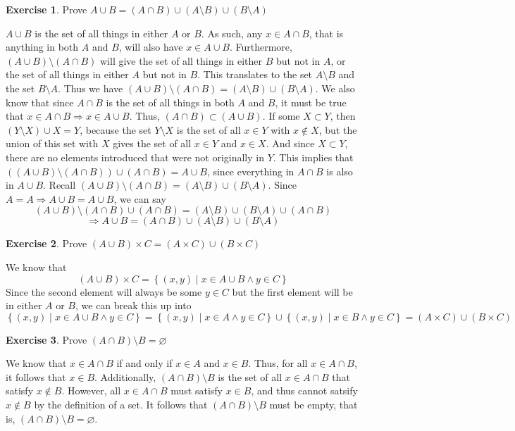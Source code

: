 \documentclass{article}
\theoremstyle{definition}
\newtheorem{environment}{Exercise}
\newenvironment{exercise}
    {\begin{mdframed}\begin{environment}}
    {\end{environment}\end{mdframed}}
\begin{document}
\begin{exercise}
    Prove \(A \cup B=(A \cap B)\cup (A\setminus B)\cup (B\setminus A)\) 
\end{exercise}
\(A\cup B\) is the set of all things in either \(A\) or \(B\). As such, any \(x\in A\cap B\), that is anything in both \(A\) and \(B\), will also have \(x\in A\cup B\). Furthermore, \((A \cup B)\setminus (A \cap B)\) will give the set of all things in either \(B\) but not in \(A\), or the set of all things in either \(A\) but not in \(B\). This translates to the set \(A\setminus B\) and the set \(B\setminus A\). Thus we have \((A\cup B)\setminus (A\cap B)=(A\setminus B)\cup (B\setminus A)\). We also know that since \(A\cap B\) is the set of all things in both \(A\) and \(B\), it must be true that \(x\in A\cap B \Longrightarrow x\in A\cup B\). Thus, \((A \cap B)\subset (A \cup B)\). If some \(X \subset Y\), then \((Y\setminus X)\cup X = Y\), because the set \(Y\setminus X\) is the set of all \(x\in Y\) with \(x\notin X\), but the union of this set with \(X\) gives the set of all \(x\in Y\) and \(x\in X\). And since \(X \subset Y\), there are no elements introduced that were not originally in \(Y\). This implies that \(((A\cup B)\setminus (A\cap B))\cup (A\cap B)=A\cup B\), since everything in \(A\cap B\) is also in \(A\cup B\). Recall \((A\cup B)\setminus (A\cap B)=(A\setminus B)\cup (B\setminus A)\). Since \(A=A \Longrightarrow A\cup B = A\cup B\), we can say
\[
    (A\cup B)\setminus (A\cap B)\cup (A\cap B)=(A\setminus B)\cup (B\setminus A)\cup (A\cap B)
\]
\[
    \Longrightarrow A\cup B=(A\cap B)\cup (A\setminus B)\cup (B\setminus A)
\]
\begin{exercise}
    Prove \((A\cup B)\times C = (A\times C)\cup (B\times C)\)
\end{exercise}
We know that
\[
    (A\cup B)\times C = \left\{ (x,y)\mid x\in A \cup B \land y\in C \right\} 
\]
Since the second element will always be some \(y\in C\) but the first element will be in either \(A\) or \(B\), we can break this up into
\[
    \left\{ (x,y)\mid x\in A \cup B \land y\in C \right\} =\left\{ (x,y)\mid x\in A \land y\in C \right\} \cup \left\{ (x,y)\mid x\in B \land y\in C \right\} =(A\times C)\cup (B\times C)
\]
\begin{exercise}
    Prove \((A\cap B)\setminus B=\varnothing \) 
\end{exercise}
We know that \(x\in A\cap B\) if and only if \(x\in A\) and \(x\in B\). Thus, for all \(x\in A\cap B\), it follows that \(x\in B\). Additionally, \((A\cap B)\setminus B\) is the set of all \(x\in A\cap B\) that satisfy \(x\notin B\). However, all \(x\in A\cap B\) must satisfy \(x\in B\), and thus cannot satsify \(x\notin B\) by the definition of a set. It follows that \((A\cap B)\setminus B\) must be empty, that is, \((A\cap B)\setminus B=\varnothing \).
\end{document}
